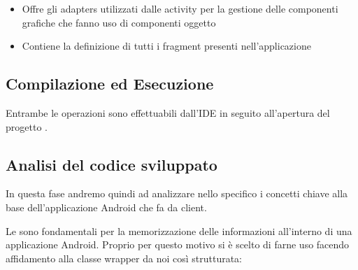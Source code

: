\begin{minipage}{0.45\textwidth}
\begin{itemize}
    \item {} \rightarrow Offre gli adapters \footnotemark utilizzati dalle activity per la gestione delle componenti grafiche che fanno uso di componenti oggetto
    \item {} \rightarrow Contiene la definizione di tutti i fragment \footnotemark presenti nell'applicazione
    \end{itemize}

  \end{minipage}



  \subsection{Compilazione ed Esecuzione}
    Entrambe le operazioni sono effettuabili dall'IDE  in seguito all'apertura del progetto \footnotemark {}.
    
  \subsection{Analisi del codice sviluppato}
    In questa fase andremo quindi ad analizzare nello specifico i concetti chiave alla base dell'applicazione Android che fa da client.

    \begin{center}  \end{center}
    Le \href{https://developer.android.com/reference/android/content/SharedPreferences}{} sono fondamentali per la memorizzazione delle informazioni all'interno di una applicazione Android. Proprio per questo motivo si è scelto di farne uso facendo affidamento alla classe wrapper  da noi così strutturata:

